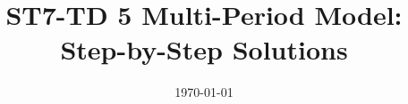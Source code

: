 \documentclass{article}
\begin{document}
\title{ST7-TD 5 Multi-Period Model: Step-by-Step Solutions}
\author{}
\date{\today}

\maketitle

\tableofcontents
\newpage



\newpage


\newpage


\newpage


\newpage


\end{document}
